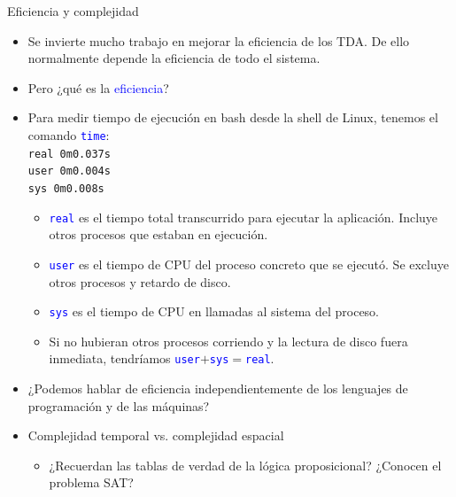 \documentclass{beamer} %
\newcommand{\blue}[1]{\textcolor{blue}{#1}}
\begin{document}
\begin{frame}{Eficiencia y complejidad}
    \begin{itemize}
      \item<1-> Se invierte mucho trabajo en mejorar la eficiencia de los TDA. De ello normalmente depende la eficiencia de todo el sistema.
      \item<2-> Pero ¿qué es la \blue{eficiencia}?
      \item<3-> Para medir tiempo de ejecución en bash desde  la shell de Linux, tenemos el comando \blue{\texttt{time}}:\\[1ex]
      \hspace{2ex} \texttt{real 0m0.037s}\\
      \hspace{2ex} \texttt{user 0m0.004s}\\
      \hspace{2ex} \texttt{sys 0m0.008s}\\
      \begin{itemize}
          \item<4-> \blue{\texttt{real}} es el tiempo total transcurrido para ejecutar la aplicación. Incluye otros procesos que estaban en ejecución.
          \item<5-> \blue{\texttt{user}} es el tiempo de CPU del proceso concreto que se ejecutó. Se excluye otros procesos y retardo de disco.
          \item<6-> \blue{\texttt{sys}} es el tiempo de CPU en llamadas al sistema del proceso.
          \item<7-> Si no hubieran otros procesos corriendo y la lectura de disco fuera inmediata, tendríamos \blue{\texttt{user}}$+$\blue{\texttt{sys}}$=$\blue{\texttt{real}}.
      \end{itemize}
    \end{itemize}
\end{frame}

\begin{frame}
   \begin{itemize}
      \item<1-> ¿Podemos hablar de eficiencia independientemente de los lenguajes de programación y de las máquinas?
      \item<2-> Complejidad temporal vs. complejidad espacial
      \begin{itemize}
          \item ¿Recuerdan las tablas de verdad de la lógica proposicional? ¿Conocen el problema SAT?
      \end{itemize}
    \end{itemize}
\end{frame}
\end{document}
